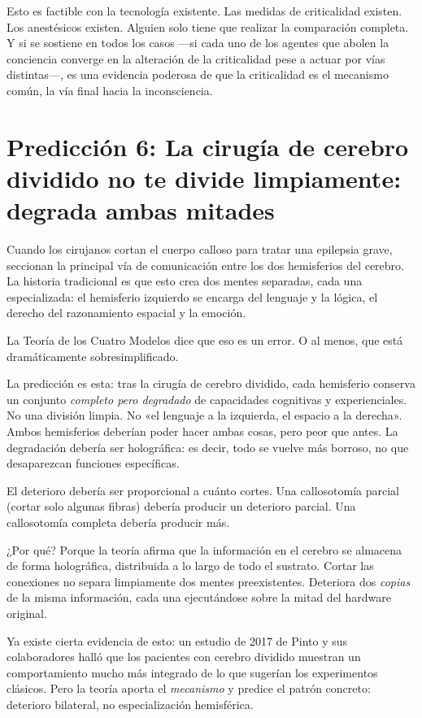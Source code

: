 \documentclass[11pt, twoside, openright]{book}
\begin{document}
Esto es factible con la tecnología existente. Las medidas de criticalidad existen. Los anestésicos existen. Alguien solo tiene que realizar la comparación completa. Y si se sostiene en todos los casos ---si cada uno de los agentes que abolen la conciencia converge en la alteración de la criticalidad pese a actuar por vías distintas---, es una evidencia poderosa de que la criticalidad es el mecanismo común, la vía final hacia la inconsciencia.

\section*{Predicción 6: La cirugía de cerebro dividido no te divide limpiamente: degrada ambas mitades}

Cuando los cirujanos cortan el cuerpo calloso para tratar una epilepsia grave, seccionan la principal vía de comunicación entre los dos hemisferios del cerebro. La historia tradicional es que esto crea dos mentes separadas, cada una especializada: el hemisferio izquierdo se encarga del lenguaje y la lógica, el derecho del razonamiento espacial y la emoción.

La Teoría de los Cuatro Modelos dice que eso es un error. O al menos, que está dramáticamente sobresimplificado.

La predicción es esta: tras la cirugía de cerebro dividido, cada hemisferio conserva un conjunto \textit{completo pero degradado} de capacidades cognitivas y experienciales. No una división limpia. No «el lenguaje a la izquierda, el espacio a la derecha». Ambos hemisferios deberían poder hacer ambas cosas, pero peor que antes. La degradación debería ser holográfica: es decir, todo se vuelve más borroso, no que desaparezcan funciones específicas.

El deterioro debería ser proporcional a cuánto cortes. Una callosotomía parcial (cortar solo algunas fibras) debería producir un deterioro parcial. Una callosotomía completa debería producir más.

¿Por qué? Porque la teoría afirma que la información en el cerebro se almacena de forma holográfica, distribuida a lo largo de todo el sustrato. Cortar las conexiones no separa limpiamente dos mentes preexistentes. Deteriora dos \textit{copias} de la misma información, cada una ejecutándose sobre la mitad del hardware original.

Ya existe cierta evidencia de esto: un estudio de 2017 de Pinto y sus colaboradores halló que los pacientes con cerebro dividido muestran un comportamiento mucho más integrado de lo que sugerían los experimentos clásicos. Pero la teoría aporta el \textit{mecanismo} y predice el patrón concreto: deterioro bilateral, no especialización hemisférica.
\end{document}
